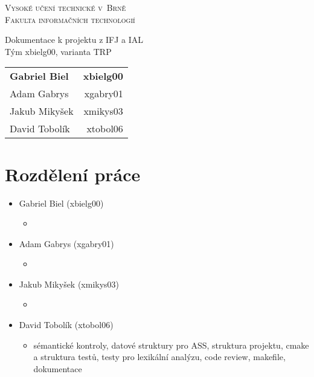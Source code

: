 \documentclass[a4paper, 12pt]{article}
\begin{document}
    \begin{titlepage}
		\centering

        \textsc{\Huge Vysoké učení technické v~Brně \\[0.3em]
            \huge Fakulta informačních technologií}


        {\Huge Dokumentace k projektu z IFJ a IAL\\[0.4em]
            \LARGE Tým xbielg00, varianta TRP}


        \begin{table}[H]
            \hfill
            \begin{tabularx}{0.5\textwidth}{Xr}
                \textbf{Gabriel Biel} & \textbf{xbielg00} \\
                Adam Gabrys & xgabry01 \\
                Jakub Mikyšek & xmikys03 \\
                David Tobolík & xtobol06 \\
            \end{tabularx}
        \end{table}
	\end{titlepage}

    \tableofcontents
    \newpage

    \section{Rozdělení práce}
        \begin{itemize}
            \item Gabriel Biel (xbielg00)
                \begin{itemize}
                    \item
                \end{itemize}
            \item Adam Gabrys (xgabry01)
                \begin{itemize}
                    \item
                \end{itemize}
            \item Jakub Mikyšek (xmikys03)
                \begin{itemize}
                    \item
                \end{itemize}
            \item David Tobolík (xtobol06)
                \begin{itemize}
                    \item sémantické kontroly, datové struktury pro ASS, struktura projektu, cmake a struktura testů, testy pro lexikální analýzu, code review, makefile, dokumentace
                \end{itemize}
        \end{itemize}

    \newpage
	\renewcommand{\refname}{Zdroje}
	\printbibliography
\end{document}
